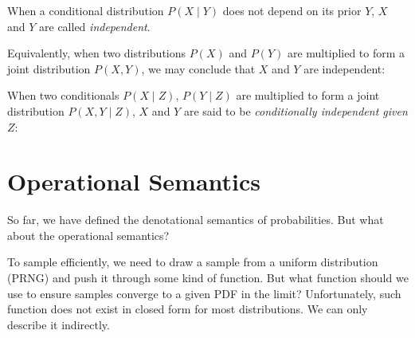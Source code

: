 \documentclass{article}
\begin{document}
When a conditional distribution $P(X \mid Y)$ does not depend on its prior $Y$, $X$ and $Y$ are called \textit{independent}.

\begin{prooftree}
\end{prooftree}


Equivalently, when two distributions $P(X)$ and $P(Y)$ are multiplied to form a joint distribution $P(X, Y)$, we may conclude that $X$ and $Y$ are independent:

\begin{prooftree}
\end{prooftree}

When two conditionals $P(X \mid Z)$, $P(Y \mid Z)$ are multiplied to form a joint distribution $P(X, Y \mid Z)$, $X$ and $Y$ are said to be \textit{conditionally independent given $Z$}:

\begin{prooftree}
\end{prooftree}

%
%

\section{Operational Semantics}

So far, we have defined the denotational semantics of probabilities. But what about the operational semantics?

To sample efficiently, we need to draw a sample from a uniform distribution (PRNG) and push it through some kind of function. But what function should we use to ensure samples converge to a given PDF in the limit? Unfortunately, such function does not exist in closed form for most distributions. We can only describe it indirectly.


\begin{prooftree}
\end{prooftree}
\end{document}
